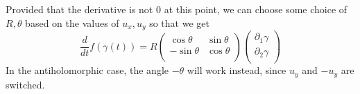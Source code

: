 \documentclass{homework}
\begin{document}
\begin{solution}
                                                                                                                                                                                          Provided that the derivative is not 0 at this point, we can choose some choice of $R, \theta$ based on the values of $u_x, u_y$ so that we get
                                                                                                                                                                                          \[\frac{d}{dt} f(\gamma(t)) = 
                                                                                                                                                                                          R
                                                                                                                                                                                          \begin{pmatrix}
                                                                                                                                                                                          \cos{\theta} & \sin{\theta}\\
                                                                                                                                                                                          -\sin{\theta} & \cos{\theta}\\
                                                                                                                                                                                          \end{pmatrix}
                                                                                                                                                                                          \begin{pmatrix}
                                                                                                                                                                                          \partial_1\gamma\\
                                                                                                                                                                                          \partial_2\gamma\\
                                                                                                                                                                                          \end{pmatrix}
                                                                                                                                                                                          \]
                                                                                                                                                                                          In the antiholomorphic case, the angle $-\theta$ will work instead, since $u_y$ and $-u_y$ are switched. 


\end{solution}
\end{document}
